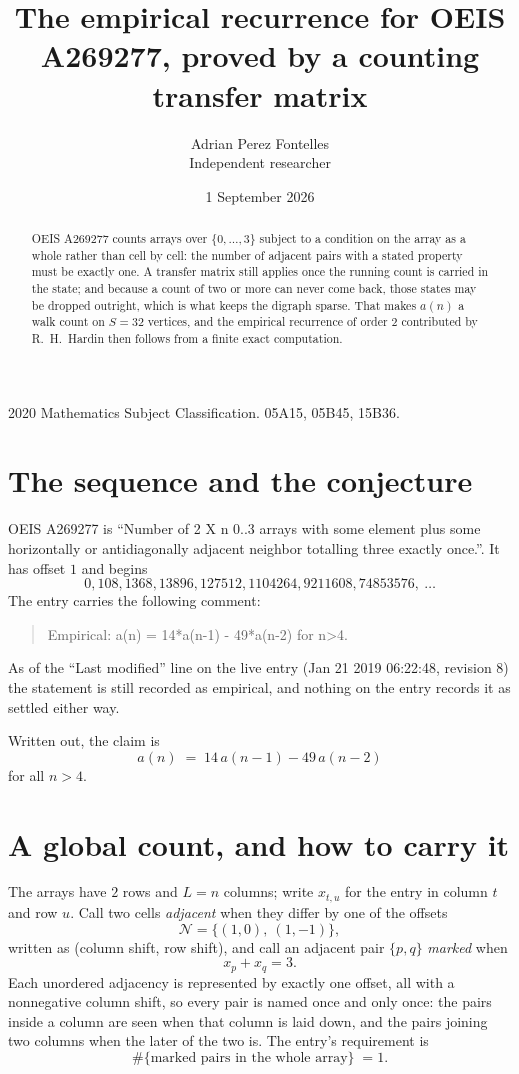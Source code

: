 \documentclass[11pt,a4paper]{article}
\title{The empirical recurrence for OEIS A269277, proved by a counting transfer matrix}
\author{Adrian Perez Fontelles\\ \small Independent researcher}
\date{1 September 2026}
\theoremstyle{plain}
\theoremstyle{definition}
\begin{document}
\maketitle

\begin{abstract}
OEIS A269277 counts arrays over $\{0,\dots,3\}$ subject to a condition on the array as a
whole rather than cell by cell: the number of adjacent pairs with a stated property must be
exactly one. A transfer matrix still applies once the running count is carried in the state; and
because a count of two or more can never come back, those states may be dropped outright,
which is what keeps the digraph sparse. That makes $a(n)$ a walk count on $S=32$ vertices,
and the empirical recurrence of order $2$ contributed by R.~H.~Hardin then follows from
a finite exact computation.
\end{abstract}

\noindent\small 2020 Mathematics Subject Classification. 05A15, 05B45, 15B36.\normalsize

\section{The sequence and the conjecture}

OEIS A269277 is ``Number of 2 X n 0..3 arrays with some element plus some horizontally or antidiagonally adjacent neighbor totalling three exactly once.''. It has offset $1$ and begins
\[
0, 108, 1368, 13896, 127512, 1104264, 9211608, 74853576,\ \dots
\]
The entry carries the following comment:
\begin{quote}\small
Empirical: a(n) = 14*a(n-1) - 49*a(n-2) for n>4.
\end{quote}
As of the ``Last modified'' line on the live entry (Jan 21 2019 06:22:48, revision 8) the statement is
still recorded as empirical, and nothing on the entry records it as settled either way.

Written out, the claim is
\begin{equation}\label{eq:conj}
a(n)\;=\;14\,a(n-1) - 49\,a(n-2)
\end{equation}
for all $n>4$.

\section{A global count, and how to carry it}

The arrays have $2$ rows and $L=n$ columns; write $x_{t,u}$ for the entry in
column $t$ and row $u$. Call two cells \emph{adjacent} when they differ by one of the
offsets
\[
\mathcal N=\{(1,0),\ (1,-1)\},
\]
written as (column shift, row shift), and call an adjacent pair $\{p,q\}$
\emph{marked} when
\[
x_{p}+x_{q}=3 .
\]
Each unordered adjacency is represented by exactly one offset, all with a nonnegative column
shift, so every pair is named once and only once: the pairs inside a column are seen when
that column is laid down, and the pairs joining two columns when the later of the two is. The
entry's requirement is
\begin{equation}\label{eq:glob}
\#\{\text{marked pairs in the whole array}\}\;=1.
\end{equation}
\end{document}
